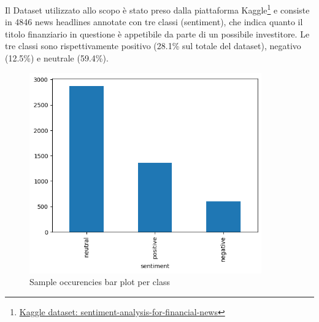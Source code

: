 Il Dataset utilizzato allo scopo è stato preso dalla piattaforma Kaggle\footnote{\href{https://www.kaggle.com/datasets/ankurzing/sentiment-analysis-for-financial-news}{Kaggle dataset: sentiment-analysis-for-financial-news}} e consiste in 4846 news headlines annotate con tre classi (sentiment), che indica quanto il titolo finanziario in questione è appetibile da parte di un possibile investitore. Le tre classi sono rispettivamente positivo (28.1\% sul totale del dataset), negativo (12.5\%) e neutrale (59.4\%).

\begin{figure}[!ht]
    \centering
    \includegraphics[width=10cm]{./images/dataset_percentage_bar_plot.png}
    \caption{Sample occurencies bar plot per class }
\end{figure}

\newpage



